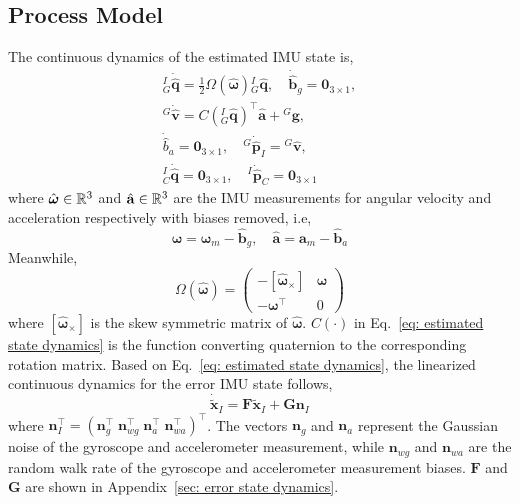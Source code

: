 \subsection{Process Model}
\label{subsec: process model}
The continuous dynamics of the estimated IMU state is,
\begin{equation}
\label{eq: estimated state dynamics}
\begin{gathered}
{}^I_G\dot{\hat{\mathbf{q}}} = \frac{1}{2}\Omega(\hat{\bm{\omega}}) {}^I_G\hat{\mathbf{q}}, \quad
\dot{\hat{\mathbf{b}}}_g = \mathbf{0}_{3\times 1}, \\
{}^G\dot{\hat{\mathbf{v}}} = C\left({}^I_G\hat{\mathbf{q}}\right)^\top \hat{\mathbf{a}} + {}^G\mathbf{g}, \\
\dot{\hat{b}}_a = \mathbf{0}_{3\times 1}, \quad
{}^G\dot{\hat{\mathbf{p}}}_I = {}^G\hat{\mathbf{v}}, \\
{}^I_C\dot{\hat{\mathbf{q}}} = \mathbf{0}_{3\times 1}, \quad
{}^I\dot{\hat{\mathbf{p}}}_C = \mathbf{0}_{3\times 1}
\end{gathered}
\end{equation}
where $\hat{\bm{\omega}} \in \mathbb{R}^3$ and $\hat{\mathbf{a}} \in \mathbb{R}^3$ are the IMU measurements for angular velocity and acceleration respectively with biases removed, i.e,
\begin{equation*}
\hat{\bm{\omega}} = \bm{\omega}_m - \hat{\mathbf{b}}_g, \quad
\hat{\mathbf{a}} = \mathbf{a}_m - \hat{\mathbf{b}}_a
\end{equation*}
Meanwhile,
\begin{equation*}
\Omega\left(\hat{\bm{\omega}}\right) = 
\begin{pmatrix}
-[\hat{\bm{\omega}}_\times] & \bm{\omega} \\
-\bm{\omega}^\top & 0
\end{pmatrix}
\end{equation*}
where $[\hat{\bm{\omega}}_\times]$ is the skew symmetric matrix of $\hat{\bm{\omega}}$. $C(\cdot)$ in Eq.~\eqref{eq: estimated state dynamics} is the function converting quaternion to the corresponding rotation matrix. Based on Eq.~\eqref{eq: estimated state dynamics}, the linearized continuous dynamics for the error IMU state follows,
\begin{equation}
\label{eq: error state dynamics}
\dot{\tilde{\mathbf{x}}}_I = 
\mathbf{F} \tilde{\mathbf{x}}_I + 
\mathbf{G} \mathbf{n}_I
\end{equation}
where $\mathbf{n}_I^\top = \left(\mathbf{n}_g^\top \; \mathbf{n}_{wg}^\top \; \mathbf{n}_a^\top \; \mathbf{n}_{wa}^\top\right)^\top$. The vectors $\mathbf{n}_g$ and $\mathbf{n}_a$ represent the Gaussian noise of the gyroscope and accelerometer measurement, while $\mathbf{n}_{wg}$ and $\mathbf{n}_{wa}$ are the random walk rate of the gyroscope and accelerometer measurement biases. $\mathbf{F}$ and $\mathbf{G}$ are shown in Appendix~\ref{sec: error state dynamics}.

